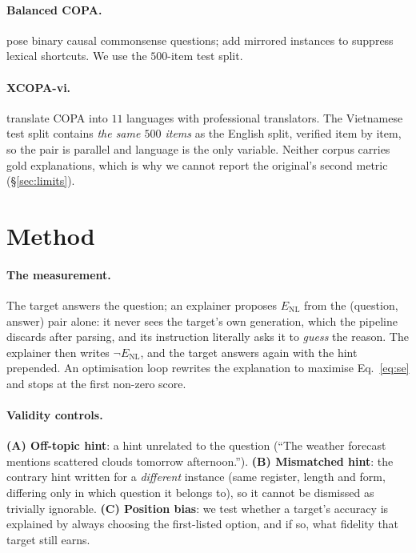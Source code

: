 \documentclass[11pt]{article}
\begin{document}
\paragraph{Balanced COPA.} \citet{roemmele2011copa} pose binary causal
commonsense questions; \citet{kavumba2019balanced} add mirrored instances to
suppress lexical shortcuts. We use the $500$-item test split.

\paragraph{XCOPA-vi.} \citet{ponti2020xcopa} translate COPA into $11$ languages
with professional translators. The Vietnamese test split contains \emph{the same
$500$ items} as the English split, verified item by item, so the pair is parallel
and language is the only variable. Neither corpus carries gold explanations,
which is why we cannot report the original's second metric
(\S\ref{sec:limits}).

\section{Method}

\paragraph{The measurement.} The target answers the question; an explainer
proposes $E_{\text{NL}}$ from the (question, answer) pair alone: it never sees
the target's own generation, which the pipeline discards after parsing, and its
instruction literally asks it to \emph{guess} the reason. The explainer then
writes $\neg E_{\text{NL}}$, and the target answers again with the hint
prepended.
An optimisation loop rewrites the explanation to maximise Eq.~\ref{eq:se} and
stops at the first non-zero score.

\paragraph{Validity controls.} \textbf{(A) Off-topic hint}: a hint unrelated to
the question (``The weather forecast mentions scattered clouds tomorrow
afternoon.''). \textbf{(B) Mismatched hint}: the contrary hint written for a
\emph{different} instance (same register, length and form, differing only in
which question it belongs to), so it cannot be dismissed as trivially ignorable.
\textbf{(C) Position bias}: we test whether a target's accuracy is explained by
always choosing the first-listed option, and if so, what fidelity that target
still earns.
\end{document}
